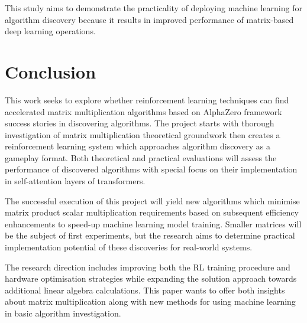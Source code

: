 \documentclass{article}
\begin{document}
This study aims to demonstrate the practicality of deploying machine learning for algorithm discovery because it results in improved performance of matrix-based deep learning operations.

\section{Conclusion}
This work seeks to explore whether reinforcement learning techniques can find accelerated matrix multiplication algorithms based on AlphaZero framework success stories in discovering algorithms. The project starts with thorough investigation of matrix multiplication theoretical groundwork then creates a reinforcement learning system which approaches algorithm discovery as a gameplay format. Both theoretical and practical evaluations will assess the performance of discovered algorithms with special focus on their implementation in self-attention layers of transformers.

The successful execution of this project will yield new algorithms which minimise matrix product scalar multiplication requirements based on subsequent efficiency enhancements to speed-up machine learning model training. Smaller matrices will be the subject of first experiments, but the research aims to determine practical implementation potential of these discoveries for real-world systems.

The research direction includes improving both the RL training procedure and hardware optimisation strategies while expanding the solution approach towards additional linear algebra calculations. This paper wants to offer both insights about matrix multiplication along with new methods for using machine learning in basic algorithm investigation.
\end{document}
